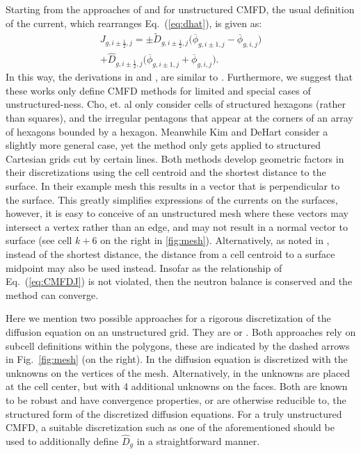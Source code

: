 \documentclass{anstrans}
\renewcommand{\bar}[1]{\overline{#1}} %
\newcommand{\half}{\frac{1}{2}}
\renewcommand{\eqref}[1]{Eq.~(\ref{#1})}
\newcommand{\figref}[1]{Fig.~\ref{#1}}
\begin{document}
Starting from the approaches of \cite{CHO2008} and \cite{Kim2011} for unstructured CMFD, the usual definition of the current, which rearranges \eqref{eq:dhat}, is given as:
\begin{multline} \label{eq:CMFDJ}
    J_{g,i\pm\half,j} = \pm \tilde D_{g,i\pm\half,j}\Big(\bar\phi_{g,i\pm1,j}-\bar\phi_{g,i,j}\Big) \\
       + \hat D_{g,i\pm\half,j} \Big(\bar\phi_{g,i\pm1,j}+\bar\phi_{g,i,j}\Big) .
\end{multline}
In this way, the derivations in \cite{CHO2008} and \cite{Kim2011}, are similar to \cite{Smith2002}. Furthermore, we suggest that these works only define CMFD methods for limited and special cases of unstructured-ness. Cho, et. al only consider cells of structured hexagons (rather than squares), and the irregular pentagons that appear at the corners of an array of hexagons bounded by a hexagon. Meanwhile Kim and DeHart consider a slightly more general case, yet the method only gets applied to structured Cartesian grids cut by certain lines. Both methods develop geometric factors in their discretizations using the cell centroid and the shortest distance to the surface. In their example mesh this results in a vector that is perpendicular to the surface. This greatly simplifies expressions of the currents on the surfaces, however, it is easy to conceive of an unstructured mesh where these vectors may intersect a vertex rather than an edge, and may not result in a normal vector to surface (see cell $k+6$ on the right in \ref{fig:mesh}). Alternatively, as noted in \cite{Kim2011}, instead of the shortest distance, the distance from a cell centroid to a surface midpoint may also be used instead. Insofar as the relationship of \eqref{eq:CMFDJ} is not violated, then the neutron balance is conserved and the method can converge.

Here we mention two possible approaches for a rigorous discretization of the diffusion equation on an unstructured grid. They are \cite{Palmer2001} or \cite{Breil2007}. Both approaches rely on subcell definitions within the polygons, these are indicated by the dashed arrows in \figref{fig:mesh} (on the right). In \cite{Palmer2001} the diffusion equation is discretized with the unknowns on the vertices of the mesh. Alternatively, in \cite{Breil2007} the unknowns are placed at the cell center, but with 4 additional unknowns on the faces. Both are known to be robust and have convergence properties, or are otherwise reducible to, the structured form of the discretized diffusion equations. For a truly unstructured CMFD, a suitable discretization such as one of the aforementioned should be used to additionally define $\hat D_g$ in a straightforward manner.
\end{document}
